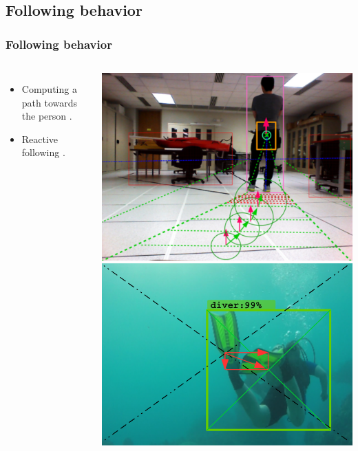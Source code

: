 \documentclass[11pt]{beamer}
\begin{document}
\subsection{Following behavior}
\begin{frame}
	\frametitle{Following behavior}
	\begin{columns}
		\begin{itemize}
			\item Computing a path towards the person \cite{personfollowing_summary}.
			\vspace{2cm}
			\item Reactive following \cite{personfollowing_reactive}.
		\end{itemize}
		
		\begin{center}
			\includegraphics[width=0.8\linewidth]{following_planning} \\
			\vspace{0.2cm}
			\includegraphics[width=0.8\linewidth]{following_reactive} \\
			
		\end{center}
	\end{columns}
\end{frame}
\end{document}
